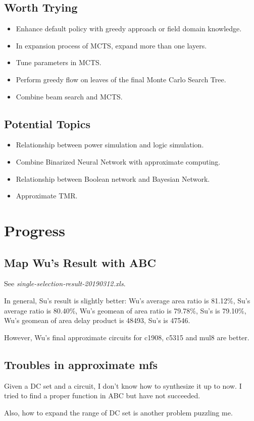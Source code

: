 \documentclass{article}
\begin{document}
\subsection{Worth Trying}
\begin{itemize}
    \item Enhance default policy with greedy approach or field domain knowledge.
    \item In expansion process of MCTS, expand more than one layers.
    \item Tune parameters in MCTS\@.
    \item Perform greedy flow on leaves of the final Monte Carlo Search Tree.
    \item Combine beam search and MCTS\@.
\end{itemize}

\subsection{Potential Topics}
\begin{itemize}
    \item Relationship between power simulation and logic simulation.
    \item Combine Binarized Neural Network with approximate computing.
    \item Relationship between Boolean network and Bayesian Network.
    \item Approximate TMR\@.
\end{itemize}

\section{Progress}
\subsection{Map Wu's Result with ABC}
See \textit{single-selection-result-20190312.xls}.

In general,
Su's result is slightly better:
Wu's average area ratio is 81.12\%, Su's average ratio is 80.40\%,
Wu's geomean of area ratio is 79.78\%, Su's is 79.10\%,
Wu's geomean of area delay product is 48493, Su's is 47546.

However,
Wu's final approximate circuits for c1908, c5315 and mul8 are better.

\subsection{Troubles in approximate mfs}
Given a DC set and a circuit,
I don't know how to synthesize it up to now.
I tried to find a proper function in ABC but have not succeeded.

Also,
how to expand the range of DC set is another problem puzzling me.
\end{document}
